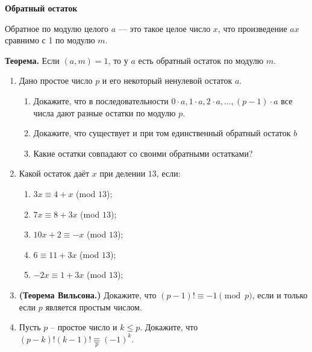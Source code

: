 \documentclass{article}
\begin{document}
\large
	
	
	\begin{center}
		\textbf{Обратный остаток}
	\end{center}

Обратное по модулю целого $a$ --- это такое целое число $x$, что произведение $ax$ сравнимо с 1 по модулю $m$.

\textbf{Теорема.} Если $(a,m) = 1$, то у $a$ есть обратный остаток по модулю $m$.


\begin{enumerate}[label*=\protect\fbox{\arabic{enumi}}]
	
\item Дано простое число $p$ и его некоторый ненулевой остаток $a$.
	\begin{enumerate}
		\item Докажите, что в последовательности $0 \cdot a, 1 \cdot a, 2 \cdot a, \dots ,(p - 1) \cdot a$ все числа дают разные остатки по модулю $p$.
		
		\item Докажите, что существует и при том единственный обратный остаток $b$
		
		\item Какие остатки совпадают со своими обратными остатками?
	\end{enumerate}
\item Какой остаток даёт $x$ при делении $13$, если:
	\begin{enumerate}
	 	\item $3x \equiv 4 + x$ (mod $13$);
	 	
	 	\item $7x \equiv 8 + 3x$ (mod $13$);
	 	
	 	\item $10x + 2 \equiv -x$ (mod $13$);
	 	
	 	\item $6 \equiv 11 + 3x$ (mod $13$);
	 	
	 	\item $-2x \equiv 1 + 3x$ (mod $13$);
	 	
	\end{enumerate}
\item \textbf{(Теорема Вильсона.)} Докажите, что $(p-1)!\equiv -1\pmod p$, если и только если $p$ является простым числом.

\item Пусть $p$ -- простое число и $k \leqslant p$. Докажите, что $(p - k)!(k - 1)! \underset{p}{\equiv} (-1)^k$.


\end{enumerate}
\end{document}
